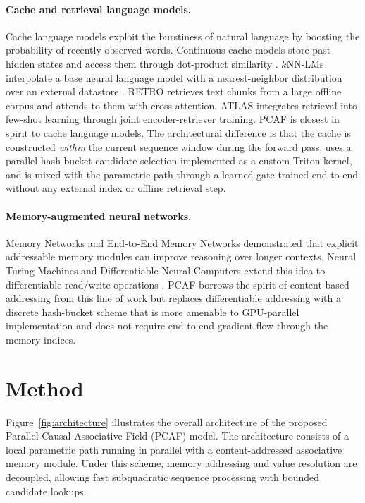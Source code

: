 \documentclass{article}
\begin{document}
\paragraph{Cache and retrieval language models.}
Cache language models exploit the burstiness of natural language by boosting
the probability of recently observed words. Continuous cache models store past
hidden states and access them through dot-product similarity
\citep{grave2016continuous}. $k$NN-LMs interpolate a base neural language model
with a nearest-neighbor distribution over an external datastore
\citep{khandelwal2019knn}. RETRO \citep{borgeaud2022retro} retrieves
text chunks from a large offline corpus and attends to them with
cross-attention. ATLAS \citep{izacard2022atlas} integrates retrieval into
few-shot learning through joint encoder-retriever training. PCAF is closest in
spirit to cache language models. The architectural difference is that the cache
is constructed \emph{within} the current sequence window during the forward
pass, uses a parallel hash-bucket candidate selection implemented as a custom
Triton kernel, and is mixed with the parametric path through a learned gate
trained end-to-end without any external index or offline retrieval step.

\paragraph{Memory-augmented neural networks.}
Memory Networks \citep{weston2015memory} and End-to-End Memory Networks
\citep{sukhbaatar2015end2end} demonstrated that explicit addressable memory
modules can improve reasoning over longer contexts. Neural Turing Machines and
Differentiable Neural Computers extend this idea to differentiable read/write
operations \citep{graves2014neural}. PCAF borrows the spirit of content-based
addressing from this line of work but replaces differentiable addressing with a
discrete hash-bucket scheme that is more amenable to GPU-parallel
implementation and does not require end-to-end gradient flow through the memory
indices.

\section{Method}

Figure~\ref{fig:architecture} illustrates the overall architecture of the proposed Parallel Causal Associative Field (PCAF) model. The architecture consists of a local parametric path running in parallel with a content-addressed associative memory module. Under this scheme, memory addressing and value resolution are decoupled, allowing fast subquadratic sequence processing with bounded candidate lookups.
\end{document}
